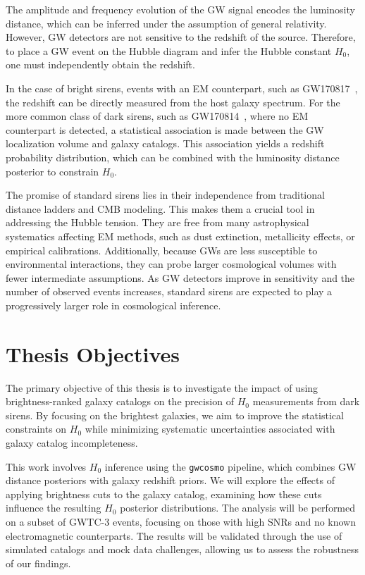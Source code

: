 The amplitude and frequency evolution of the \ac{GW} signal encodes the luminosity distance, which can be inferred under the assumption of general relativity. However, \ac{GW} detectors are not sensitive to the redshift of the source. Therefore, to place a \ac{GW} event on the Hubble diagram and infer the Hubble constant $H_0$, one must independently obtain the redshift.

In the case of bright sirens, events with an \ac{EM} counterpart, such as GW170817~\citep{LIGOScientific:2017adf}, the redshift can be directly measured from the host galaxy spectrum. For the more common class of dark sirens, such as GW170814~\citep{DES:2019ccw}, where no \ac{EM} counterpart is detected, a statistical association is made between the \ac{GW} localization volume and galaxy catalogs. This association yields a redshift probability distribution, which can be combined with the luminosity distance posterior to constrain $H_0$.

The promise of standard sirens lies in their independence from traditional distance ladders and \ac{CMB} modeling. This makes them a crucial tool in addressing the Hubble tension. They are free from many astrophysical systematics affecting \ac{EM} methods, such as dust extinction, metallicity effects, or empirical calibrations. Additionally, because \acp{GW} are less susceptible to environmental interactions, they can probe larger cosmological volumes with fewer intermediate assumptions. As \ac{GW} detectors improve in sensitivity and the number of observed events increases, standard sirens are expected to play a progressively larger role in cosmological inference.

\section{Thesis Objectives}
The primary objective of this thesis is to investigate the impact of using brightness-ranked galaxy catalogs on the precision of $H_0$ measurements from dark sirens. By focusing on the brightest galaxies, we aim to improve the statistical constraints on $H_0$ while minimizing systematic uncertainties associated with galaxy catalog incompleteness.

This work involves $H_0$ inference using the \texttt{gwcosmo} pipeline, which combines \ac{GW} distance posteriors with galaxy redshift priors. We will explore the effects of applying brightness cuts to the galaxy catalog, examining how these cuts influence the resulting $H_0$ posterior distributions. The analysis will be performed on a subset of \ac{GWTC}-3 events, focusing on those with high \acp{SNR} and no known electromagnetic counterparts. The results will be validated through the use of simulated catalogs and mock data challenges, allowing us to assess the robustness of our findings.

